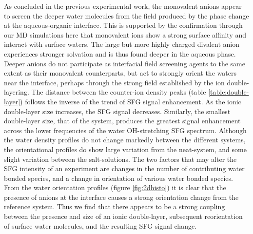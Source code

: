 As concluded in the previous experimental work, the monovalent anions appear to screen the deeper water molecules from the field produced by the phase change at the aqueous-organic interface. This is supported by the confirmation through our MD simulations here that monovalent ions show a strong surface affinity and interact with surface waters. The large but more highly charged divalent \sul anion experiences stronger solvation and is thus found deeper in the aqueous phase. Deeper anions do not participate as interfacial field screening agents to the same extent as their monovalent counterparts, but act to strongly orient the waters near the interface, perhaps through the strong field established by the ion double-layering. The distance between the counter-ion density peaks (table \ref{table:double-layer}) follows the inverse of the trend of SFG signal enhancement. As the ionic double-layer size increases, the SFG signal decreases. Similarly, the smallest double-layer size, that of the \sul system, produces the greatest signal enhancement across the lower frequencies of the water OH-stretching SFG spectrum. Although the water density profiles do not change markedly between the different systems, the orientational profiles do show large variation from the neat-\ctcwat system, and some slight variation between the salt-solutions. The two factors that may alter the SFG intensity of an experiment are changes in the number of contributing water bonded species, and a change in orientation of various water bonded species. From the water orientation profiles (figure \ref{fig:2dhisto}) it is clear that the presence of anions at the \ctcwat interface causes a strong orientation change from the reference \ctcwat system. Thus we find that there appears to be a strong coupling between the presence and size of an ionic double-layer, subsequent reorientation of surface water molecules, and the resulting SFG signal change.
